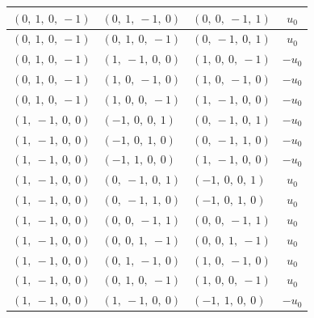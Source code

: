 \documentclass[11pt]{article}
\theoremstyle{definition}
\begin{document}
\begin{longtable}{|l|l|l|c|}
    \hline
    $\left( 0, \  1, \  0, \  -1\right)$ & $\left( 0, \  1, \  -1, \  0\right)$ & $\left( 0, \  0, \  -1, \  1\right)$ & $u_{0}$ \\
    \hline
    $\left( 0, \  1, \  0, \  -1\right)$ & $\left( 0, \  1, \  0, \  -1\right)$ & $\left( 0, \  -1, \  0, \  1\right)$ & $u_{0}$ \\
    \hline
    $\left( 0, \  1, \  0, \  -1\right)$ & $\left( 1, \  -1, \  0, \  0\right)$ & $\left( 1, \  0, \  0, \  -1\right)$ & $- u_{0}$ \\
    \hline
    $\left( 0, \  1, \  0, \  -1\right)$ & $\left( 1, \  0, \  -1, \  0\right)$ & $\left( 1, \  0, \  -1, \  0\right)$ & $- u_{0}$ \\
    \hline
    $\left( 0, \  1, \  0, \  -1\right)$ & $\left( 1, \  0, \  0, \  -1\right)$ & $\left( 1, \  -1, \  0, \  0\right)$ & $- u_{0}$ \\
    \hline
    $\left( 1, \  -1, \  0, \  0\right)$ & $\left( -1, \  0, \  0, \  1\right)$ & $\left( 0, \  -1, \  0, \  1\right)$ & $- u_{0}$ \\
    \hline
    $\left( 1, \  -1, \  0, \  0\right)$ & $\left( -1, \  0, \  1, \  0\right)$ & $\left( 0, \  -1, \  1, \  0\right)$ & $- u_{0}$ \\
    \hline
    $\left( 1, \  -1, \  0, \  0\right)$ & $\left( -1, \  1, \  0, \  0\right)$ & $\left( 1, \  -1, \  0, \  0\right)$ & $- u_{0}$ \\
    \hline
    $\left( 1, \  -1, \  0, \  0\right)$ & $\left( 0, \  -1, \  0, \  1\right)$ & $\left( -1, \  0, \  0, \  1\right)$ & $u_{0}$ \\
    \hline
    $\left( 1, \  -1, \  0, \  0\right)$ & $\left( 0, \  -1, \  1, \  0\right)$ & $\left( -1, \  0, \  1, \  0\right)$ & $u_{0}$ \\
    \hline
    $\left( 1, \  -1, \  0, \  0\right)$ & $\left( 0, \  0, \  -1, \  1\right)$ & $\left( 0, \  0, \  -1, \  1\right)$ & $u_{0}$ \\
    \hline
    $\left( 1, \  -1, \  0, \  0\right)$ & $\left( 0, \  0, \  1, \  -1\right)$ & $\left( 0, \  0, \  1, \  -1\right)$ & $u_{0}$ \\
    \hline
    $\left( 1, \  -1, \  0, \  0\right)$ & $\left( 0, \  1, \  -1, \  0\right)$ & $\left( 1, \  0, \  -1, \  0\right)$ & $u_{0}$ \\
    \hline
    $\left( 1, \  -1, \  0, \  0\right)$ & $\left( 0, \  1, \  0, \  -1\right)$ & $\left( 1, \  0, \  0, \  -1\right)$ & $u_{0}$ \\
    \hline
    $\left( 1, \  -1, \  0, \  0\right)$ & $\left( 1, \  -1, \  0, \  0\right)$ & $\left( -1, \  1, \  0, \  0\right)$ & $- u_{0}$ \\

\end{longtable}
\end{document}
